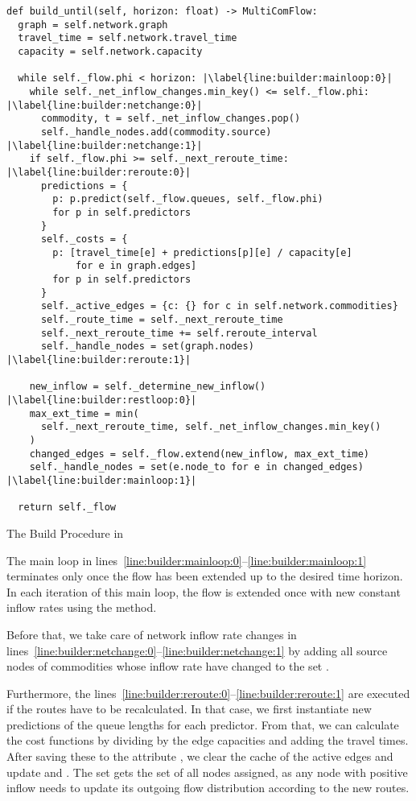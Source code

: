 \begin{algorithm}
  \begin{verbatim}
def build_until(self, horizon: float) -> MultiComFlow:
  graph = self.network.graph
  travel_time = self.network.travel_time
  capacity = self.network.capacity

  while self._flow.phi < horizon: |\label{line:builder:mainloop:0}|
    while self._net_inflow_changes.min_key() <= self._flow.phi: |\label{line:builder:netchange:0}|
      commodity, t = self._net_inflow_changes.pop()
      self._handle_nodes.add(commodity.source) |\label{line:builder:netchange:1}|
    if self._flow.phi >= self._next_reroute_time: |\label{line:builder:reroute:0}|
      predictions = {
        p: p.predict(self._flow.queues, self._flow.phi)
        for p in self.predictors
      }
      self._costs = {
        p: [travel_time[e] + predictions[p][e] / capacity[e]
            for e in graph.edges]
        for p in self.predictors
      }
      self._active_edges = {c: {} for c in self.network.commodities}
      self._route_time = self._next_reroute_time
      self._next_reroute_time += self.reroute_interval
      self._handle_nodes = set(graph.nodes) |\label{line:builder:reroute:1}|

    new_inflow = self._determine_new_inflow() |\label{line:builder:restloop:0}|
    max_ext_time = min(
      self._next_reroute_time, self._net_inflow_changes.min_key()
    )
    changed_edges = self._flow.extend(new_inflow, max_ext_time)
    self._handle_nodes = set(e.node_to for e in changed_edges) |\label{line:builder:mainloop:1}|

  return self._flow
\end{verbatim}
\caption{The Build Procedure in }
\label{alg:extend-flow-builder}
\end{algorithm}

The main loop in lines~\ref{line:builder:mainloop:0}--\ref{line:builder:mainloop:1} 
terminates only once the flow has been extended up to the desired time horizon.
In each iteration of this main loop, the flow is extended once with new constant inflow rates using the  method.

Before that, we take care of network inflow rate changes in lines~\ref{line:builder:netchange:0}--\ref{line:builder:netchange:1} by adding all source nodes of commodities whose inflow rate have changed to the set .

Furthermore, the lines~\ref{line:builder:reroute:0}--\ref{line:builder:reroute:1} are executed if the routes have to be recalculated.
In that case, we first instantiate new predictions of the queue lengths for each predictor.
From that, we can calculate the cost functions by dividing by the edge capacities and adding the travel times.
After saving these to the attribute , we clear the cache of the active edges and update  and .
The set  gets the set of all nodes assigned, as any node with positive inflow needs to update its outgoing flow distribution according to the new routes.

